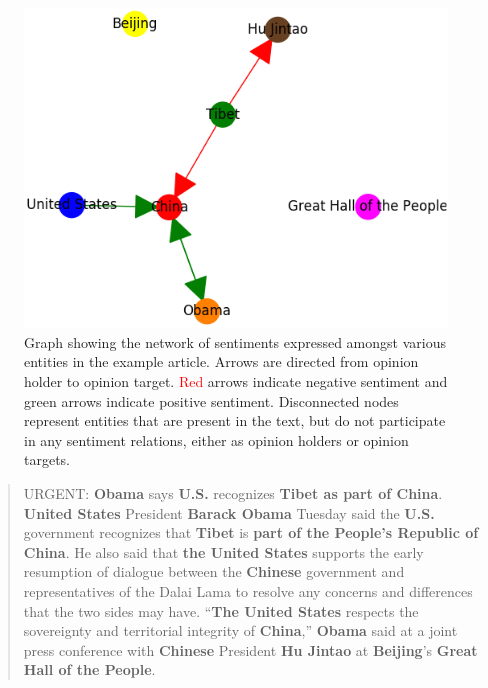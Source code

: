 \documentclass[11pt,a4paper]{article}
\begin{document}
\begin{figure} \label{fig:intro}
\centering
\includegraphics[scale=0.5]{example_article.png}
\caption{Graph showing the network of sentiments expressed amongst various entities in the example article. Arrows are directed from opinion holder to opinion target. \textcolor{red}{Red} arrows indicate negative sentiment and \textcolor[rgb]{0, 0.5, 0}{green} arrows indicate positive sentiment. Disconnected nodes represent entities that are present in the text, but do not participate in any sentiment relations, either as opinion holders or opinion targets.}
\end{figure}
\begin{quote}
URGENT: \textcolor[rgb]{1, 0.5, 0}{\textbf{Obama}} says \textcolor[rgb]{0, 0, 1}{\textbf{U.S.}} recognizes \textcolor[rgb]{0, 0.5, 0}{\textbf{\textcolor[rgb]{0, 0.5, 0}{\textbf{Tibet}} as part of \textcolor[rgb]{1, 0, 0}{\textbf{China}}}}. \textcolor[rgb]{0, 0, 1}{\textbf{United States}} President \textcolor[rgb]{1, 0.5, 0}{\textbf{Barack Obama}} Tuesday said the \textcolor[rgb]{0, 0, 1}{\textbf{U.S.}} government recognizes that \textcolor[rgb]{0, 0.5, 0}{\textbf{Tibet}} is \textcolor[rgb]{0, 0.5, 0}{\textbf{part of the \textcolor[rgb]{1, 0, 0}{\textbf{People's Republic of China}}}}. He also said that \textcolor[rgb]{0, 0, 1}{\textbf{the \textcolor[rgb]{0, 0, 1}{\textbf{United States}}}} supports the early resumption of dialogue between the \textcolor[rgb]{1, 0, 0}{\textbf{Chinese}} government and representatives of the Dalai Lama to resolve any concerns and differences that the two sides may have. ``\textcolor[rgb]{0, 0, 1}{\textbf{The \textcolor[rgb]{0, 0, 1}{\textbf{United States}}}} respects the sovereignty and territorial integrity of \textcolor[rgb]{1, 0, 0}{\textbf{China}},'' \textcolor[rgb]{1, 0.5, 0}{\textbf{Obama}} said at a joint press conference with \textcolor[rgb]{1, 0, 0}{\textbf{Chinese}} President \textcolor[rgb]{0.4, 0.25, 0.13}{\textbf{Hu Jintao}} at \textcolor[rgb]{1, 1, 0}{\textbf{Beijing}}'s \textcolor[rgb]{1, 0, 1}{\textbf{Great Hall of the People}}.
\end{quote}
\end{document}
